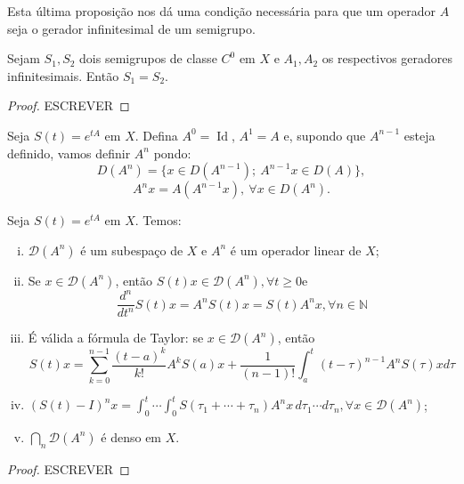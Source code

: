 \begin{remark}
    Esta última proposição nos dá uma condição necessária para que um operador $A$ seja o gerador infinitesimal de um semigrupo.
\end{remark}

\begin{proposition}[Unicidade]
Sejam $S_1,S_2$ dois semigrupos de classe $C^0$ em $X$ e $A_1,A_2$ os respectivos geradores infinitesimais. Então $S_1=S_2$.
\end{proposition}
\begin{proof}
    {\color{red} ESCREVER}
\end{proof}

\begin{definition}
    Seja $S(t)=e^{tA}$ em $X$. Defina $A^0=\operatorname{Id}$, $A^1=A$ e, supondo que $A^{n-1}$ esteja definido, vamos definir $A^n$ pondo:
\[D(A^n)=\{x\in D(A^{n-1});\ A^{n-1}x\in D(A)\},\]
\[A^nx=A(A^{n-1}x), \ \forall x\in D(A^{n}).\]
\end{definition}

\begin{proposition}
Seja $S(t)=e^{tA}$ em $X$. Temos:

\begin{enumerate}[(i)]
 \item $\mathcal{D}\left(A^n\right)$ é um subespaço de $X$ e $A^n$ é um operador linear de $X$;

 \item Se $x \in \mathcal{D}\left(A^n\right)$, então $S(t) x \in \mathcal{D}\left(A^n\right), \forall t \geq 0 \mathrm{e}$
\[
\frac{d^n}{d t^n} S(t) x=A^n S(t) x=S(t) A^n x, \forall n \in \mathbb{N}
\]
\item É válida a fórmula de Taylor: se $x \in \mathcal{D}\left(A^n\right)$, então
\[
S(t) x=\sum_{k=0}^{n-1} \frac{(t-a)^k}{k!} A^k S(a) x+\frac{1}{(n-1)!} \int_a^t(t-\tau)^{n-1} A^n S(\tau) x d \tau
\]
\item  $(S(t)-I)^n x=\int_0^t \cdots \int_0^t S\left(\tau_1+\cdots+\tau_n\right) A^n x\, d \tau_1 \cdots d \tau_n, \forall x \in \mathcal{D}\left(A^n\right)$;
\item $\displaystyle\bigcap_n \mathcal{D}\left(A^n\right)$ é denso em $X$.
\end{enumerate}
\end{proposition}

\begin{proof}
    {\color{red} ESCREVER}
\end{proof}